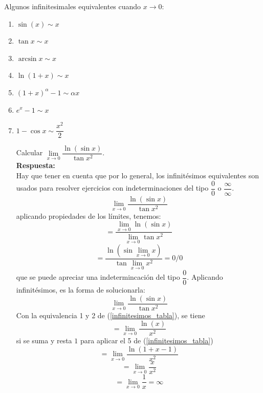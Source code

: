 \documentclass[10pt,twoside]{SelfArx} %
\begin{document}
Algunos infinitesimales equivalentes cuando $ x\rightarrow0 $:\\
\begin{enumerate}\label{infinitesimos_tabla}
	\item $ \sin(x)\sim x $
	\item $ \tan x \sim x $
	\item $ \arcsin x\sim x $
	\item $ \ln(1+x)\sim x $
	\item $ (1+x)^{\alpha}-1\sim\alpha x $
	\item $ e^{x}-1\sim x $
	\item $ 1-\cos x\sim\dfrac{x^{2}}{2} $
	
	\begin{ejemplo}
		Calcular $ \lim\limits_{x\rightarrow0}\dfrac{\ln(\sin x)}{\tan x^{2}} $.\\
		\textbf{Respuesta:}\\
		Hay que tener en cuenta que por lo general, los infinitésimos equivalentes son usados para resolver ejercicios con indeterminaciones del tipo $ \dfrac{0}{0} $ o $ \dfrac{\infty}{\infty}
		$.
		\begin{equation}
		\lim\limits_{x\rightarrow0}\dfrac{\ln(\sin x)}{\tan x^{2}}
		\end{equation}
		aplicando propiedades de los límites, tenemos:
		\begin{equation}
		=\dfrac{\lim\limits_{x\rightarrow0}\ln(\sin x)}{\lim\limits_{x\rightarrow0}\tan x^{2}}
		\end{equation}
		\begin{equation}
		=\dfrac{\ln(\sin \lim\limits_{x\rightarrow0}x)}{\tan \lim\limits_{x\rightarrow0}x^{2}}=0/0
		\end{equation}
		que se puede apreciar una indetermincación del tipo $ \dfrac{0}{0} $.
		Aplicando infinitésimos, es la forma de solucionarla:
		\begin{equation}
		\lim\limits_{x\rightarrow0}\dfrac{\ln(\sin x)}{\tan x^{2}}
		\end{equation}
		Con la equivalencia 1 y 2 de (\ref{infinitesimos_tabla}), se tiene
		\begin{equation}
		=\lim\limits_{x\rightarrow0}\dfrac{\ln(x)}{ x^{2}}
		\end{equation}
		si se suma y resta $ 1 $ para aplicar el 5 de (\ref{infinitesimos_tabla})
		\begin{equation}
		=\lim\limits_{x\rightarrow0}\dfrac{\ln(1+x-1)}{ x^{2}}
		\end{equation}
		\begin{equation}
		=\lim\limits_{x\rightarrow0}\dfrac{x}{ x^{2}}
		\end{equation}
		\begin{equation}
		=\lim\limits_{x\rightarrow0}\dfrac{1}{ x}=\infty
		\end{equation}
	\end{ejemplo}
	
	
\end{enumerate}
\end{document}
